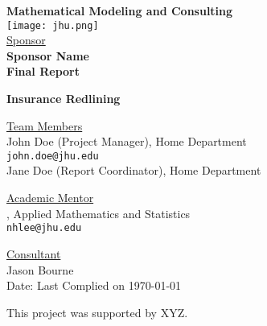 \documentclass[oneside,12pt]{report}
\begin{document}
\def\thefootnote{\fnsymbol{footnote}}

\thispagestyle{empty}

\def\shiftdowna{0.32in}  %
\def\shiftdownb{0.22in}  %


\begin{center}
\textbf{{\large Mathematical Modeling and Consulting }}\\

\vspace \shiftdowna
\texttt{[image: jhu.png]}\\

\vspace \shiftdowna
\underline {Sponsor}\\ 
\vspace{5pt}
\textbf{\large Sponsor Name} \\
\vspace\shiftdowna
\textbf{{Final Report}}

\vspace \shiftdowna
\textbf{{\Large Insurance Redlining}}

\vspace{0.35in}
\underline {Team Members}\\
\vspace{5pt}
John Doe (Project Manager), Home Department\\
\texttt{john.doe@jhu.edu} \\
\vspace{10pt}
Jane Doe (Report Coordinator), Home Department

\vspace \shiftdownb
\underline {Academic Mentor} \\
\vspace{5pt}
, Applied Mathematics and Statistics\\
\texttt{nhlee@jhu.edu}

\vspace \shiftdownb 
\underline {Consultant}\\
\vspace{5pt}
Jason Bourne\\

\vspace \shiftdowna
Date: Last Complied on \today

\end{center}

\vfill  %
\footnoterule
\noindent \small{This project was supported by XYZ.}
\end{document}
